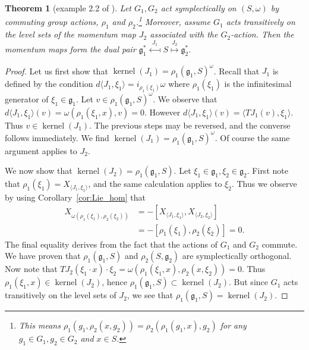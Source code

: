 \documentclass[12pt]{amsart}
\newtheorem{thm}{Theorem}[section]
\DeclareMathOperator{\kernel}{kernel}
\begin{document}
  \begin{thm}[example 2.2 of \cite{Gay-BalmazVizman2011}] \label{thm:commuting_actions}
    Let $G_1,G_2$ act symplectically on $(S,\omega)$
    by commuting group actions,
    $\rho_1$ and $\rho_2$.\footnote{
      This means 
      $\rho_1(g_1 , \rho_2 (x , g_2)) = \rho_2(\rho_1(g_1 , x) ,g_2)$
      for any $g_1 \in G_1, g_2 \in G_2$ and $x \in S$.}
    Moreover, assume $G_1$ acts transitively on the level sets of the momentum map $J_2$ associated with the  $G_2$-action.
    Then the momentum maps form the dual pair
    $
      \mathfrak{g}^*_1
      \stackrel{J_1}{\longmapsfrom}
      S
      \stackrel{J_2}{\longmapsto}
      \mathfrak{g}_2^*.
    $
  \end{thm}
  \begin{proof}
    Let us first show that $\kernel(J_1) = \rho_1(\mathfrak{g}_1 , S )^\omega$.
    Recall that $J_1$ is defined by the condition
    $d \langle J_1 , \xi_1 \rangle = i_{\rho_1(\xi_1)} \omega$
    where $\rho_1(\xi_1)$ is the infinitesimal generator of
    $\xi_1 \in \mathfrak{g}_1$.
    Let $v \in \rho_1(\mathfrak{g}_1,S)^\omega$.
    We observe that 
    $d \langle J_1 , \xi_1 \rangle (v) = \omega( \rho_1(\xi_1, x ), v ) = 0$.
    However $d\langle J_1 , \xi_1 \rangle (v) = \langle TJ_1(v) , \xi_1 \rangle$.
    Thus $v \in \kernel(J_1)$.
    The previous steps may be reversed, and
    the converse follows immediately.
    We find
    $\kernel(J_1) = \rho_1(\mathfrak{g}_1,S)^\omega$.
    Of course the same argument applies to $J_2$.

    We now show that $\kernel(J_2) = \rho_1(\mathfrak{g}_1,S)$.
    Let $\xi_1 \in \mathfrak{g}_1, \xi_2 \in \mathfrak{g}_2$.
    First note that $\rho_1(\xi_1) = X_{ \langle J_1 , \xi_1 \rangle}$,
    and the same calculation applies to $\xi_2$.
    Thus we observe by using Corollary~\ref{cor:Lie_hom} that
    \begin{align*}
      X_{ \omega( \rho_1(\xi_1) , \rho_2(\xi_2) ) }
      &= - [X_{ \langle J_1,\xi_1\rangle} , X_{\langle J_2,\xi_2\rangle} ] \\
      &= - [\rho_1(\xi_1) , \rho_2(\xi_2)] = 0.
    \end{align*}
    The final equality
    derives from the fact that the actions of $G_1$ and $G_2$ commute.
    We have proven that $\rho_1(\mathfrak{g}_1 , S)$ and $\rho_2(S,\mathfrak{g}_2)$ are
    symplectically orthogonal.
    Now note that
    $TJ_2 ( \xi_1 \cdot x) \cdot \xi_2 = \omega( \rho_1(\xi_1, x) ,\rho_2(x, \xi_2 )) = 0$.
    Thus $\rho_1(\xi_1 , x) \in \kernel( J_2)$, hence
    $\rho_1(\mathfrak{g}_1 ,S) \subset \kernel(J_2)$.
    But since $G_1$ acts transitively on the level sets of $J_2$, we see
    that $\rho_1(\mathfrak{g}_1, S) = \kernel( J_2)$.
  \end{proof}
\end{document}
